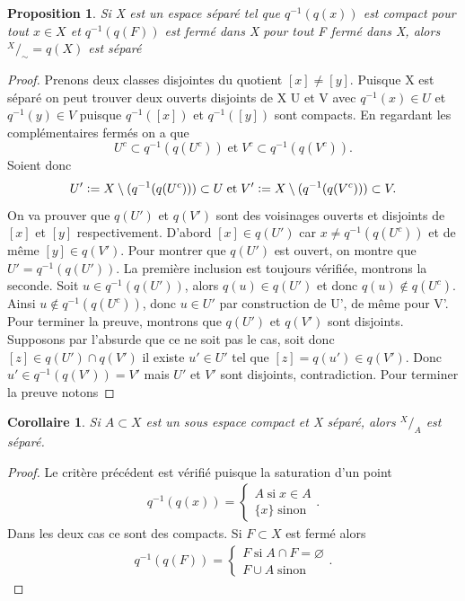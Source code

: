 \documentclass[12pt]{book}
\newcommand{\defeq}{\vcentcolon=}
\newtheorem{cor}[lemma]{Corollaire}
\newtheorem{prop}[lemma]{Proposition}
\theoremstyle{definition}
\theoremstyle{remark}
\newcommand*\quot[2]{{^{\textstyle #1}\big/_{\textstyle #2}}}
\begin{document}
	\begin{prop}
		Si X est un espace séparé tel que $q^{-1}(q(x))$ est compact pour tout  $x\in X$ et $q^{-1}(q(F))$ est fermé dans X pour tout F fermé dans X, alors $\quot{X}{\sim} = q(X)$ est séparé
	\end{prop}
	\begin{proof}
		Prenons deux classes disjointes du quotient $[x] \neq [y]$. Puisque X est séparé on peut trouver deux ouverts disjoints de X U et V avec $q^{-1}(x) \in U$ et  $q^{-1}(y) \in V$ puisque $q^{-1}([x])$ et  $q^{-1}([y])$ sont compacts. En regardant les complémentaires fermés on a que \[
			U^c \subset q^{-1}(q(U^c)) \; \text{et} \; V^c \subset q^{-1}(q(V^c))
		.\] Soient donc \[
		U' \defeq X\setminus(q^{-1}(q(U^c))) \subset U \; \text{et} \; V' \defeq X\setminus(q^{-1}(q(V^c))) \subset V
	.\]  On va prouver que $q(U')$ et  $q(V')$ sont des voisinages ouverts et disjoints de $[x]$ et $[y]$ respectivement. 
	D'abord $[x] \in q(U')$ car  $x \neq q^{-1}(q(U^c))$ et de même  $[y] \in q(V')$. Pour montrer que $q(U')$ est ouvert, on montre que  $U' = q^{-1}(q(U'))$. La première inclusion est toujours vérifiée, montrons la seconde. Soit $u \in q^{-1}(q(U'))$, alors $q(u) \in q(U')$ et donc $q(u) \not\in q(U^c)$. Ainsi  $u \not\in q^{-1}(q(U^c))$, donc $u \in U'$ par construction de U', de même pour V'. \\
	Pour terminer la preuve, montrons que $q(U')$ et  $q(V')$ sont disjoints. Supposons par l'absurde que ce ne soit pas le cas, soit donc $[z] \in q(U')\cap q(V')$ il existe  $u' \in U'$ tel que  $[z] = q(u') \in q(V')$. Donc $u' \in q^{-1}(q(V')) = V'$ mais  $U'$ et  $V'$ sont disjoints, contradiction.
	Pour terminer la preuve notons 
	\end{proof}
	\begin{cor}
		Si $A \subset X$ est un sous espace compact et X séparé, alors $\quot{X}{A}$ est séparé.
	\end{cor}
	\begin{proof}
		Le critère précédent est vérifié puisque la saturation d'un point
		\begin{align*}
			q^{-1}(q(x)) = \begin{cases}
				A \; \text{si} \; x \in A \\
				\{x\} \; \text{sinon} 
			\end{cases}
		.\end{align*} Dans les deux cas ce sont des compacts.
		Si $F \subset X$ est fermé alors 
		\begin{align*}
			q^{-1}(q(F)) = \begin{cases}
				F \; \text{si} \; A\cap F = \varnothing \\
				F \cup A \; \text{sinon}
			\end{cases}
		.\end{align*}
	\end{proof}
\end{document}
